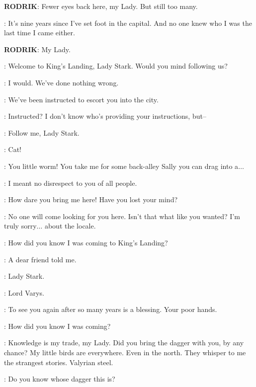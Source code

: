 

\textbf{RODRIK}: Fewer eyes back here, my Lady. But still too many. 

\CATELYN: It's nine years since I've set foot in the capital. And no one knew who I was the last time I came either. 

\textbf{RODRIK}: My Lady. 

\GUARD: Welcome to King's Landing, Lady Stark. Would you mind following us? 

\CATELYN: I would. We've done nothing wrong. 

\GUARD: We've been instructed to escort you into the city. 

\CATELYN: Instructed? I don't know who's providing your instructions, but--

\GUARD: Follow me, Lady Stark. 


\LITTLEFINGER: Cat!  

\CATELYN: You little worm! You take me for some back-alley Sally you can drag into a$\ldots$ 

\LITTLEFINGER: I meant no disrespect to you of all people. 

\CATELYN: How dare you bring me here! Have you lost your mind? 

\LITTLEFINGER: No one will come looking for you here. Isn't that what like you wanted? I'm truly sorry$\ldots$ about the locale. 

\CATELYN: How did you know I was coming to King's Landing? 

\LITTLEFINGER: A dear friend told me. 


\VARYS: Lady Stark. 

\CATELYN: Lord Varys. 

\VARYS: To see you again after so many years is a blessing. Your poor hands. 

\CATELYN: How did you know I was coming? 

\VARYS: Knowledge is my trade, my Lady. Did you bring the dagger with you, by any chance? My little birds are everywhere. Even in the north. They whisper to me the strangest stories. Valyrian steel. 

\CATELYN: Do you know whose dagger this is? 

